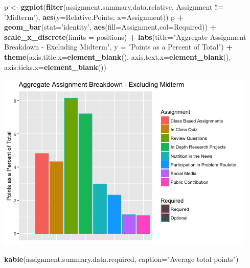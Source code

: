 \documentclass[]{article}
\newenvironment{Shaded}{\begin{snugshade}}{\end{snugshade}}
\newcommand{\KeywordTok}[1]{\textcolor[rgb]{0.13,0.29,0.53}{\textbf{#1}}}
\newcommand{\DataTypeTok}[1]{\textcolor[rgb]{0.13,0.29,0.53}{#1}}
\newcommand{\StringTok}[1]{\textcolor[rgb]{0.31,0.60,0.02}{#1}}
\newcommand{\OperatorTok}[1]{\textcolor[rgb]{0.81,0.36,0.00}{\textbf{#1}}}
\newcommand{\NormalTok}[1]{#1}
\begin{document}
\begin{Shaded}
\begin{Highlighting}[]
\NormalTok{p <-}\StringTok{ }\KeywordTok{ggplot}\NormalTok{(}\KeywordTok{filter}\NormalTok{(assignment.summary.data.relative, Assignment }\OperatorTok{!=}\StringTok{ 'Midterm'}\NormalTok{), }\KeywordTok{aes}\NormalTok{(}\DataTypeTok{y=}\NormalTok{Relative.Points, }\DataTypeTok{x=}\NormalTok{Assignment))}
\NormalTok{p }\OperatorTok{+}\StringTok{ }\KeywordTok{geom_bar}\NormalTok{(}\DataTypeTok{stat=}\StringTok{'identity'}\NormalTok{, }\KeywordTok{aes}\NormalTok{(}\DataTypeTok{fill=}\NormalTok{Assignment,}\DataTypeTok{col=}\NormalTok{Required)) }\OperatorTok{+}\StringTok{ }\KeywordTok{scale_x_discrete}\NormalTok{(}\DataTypeTok{limits =}\NormalTok{ positions) }\OperatorTok{+}\StringTok{   }
\StringTok{  }\KeywordTok{labs}\NormalTok{(}\DataTypeTok{title=}\StringTok{"Aggregate Assignment Breakdown - Excluding Midterm"}\NormalTok{, }\DataTypeTok{y =} \StringTok{"Points as a Percent of Total"}\NormalTok{) }\OperatorTok{+}
\StringTok{  }\KeywordTok{theme}\NormalTok{(}\DataTypeTok{axis.title.x=}\KeywordTok{element_blank}\NormalTok{(),}
        \DataTypeTok{axis.text.x=}\KeywordTok{element_blank}\NormalTok{(),}
        \DataTypeTok{axis.ticks.x=}\KeywordTok{element_blank}\NormalTok{())}
\end{Highlighting}
\end{Shaded}

\includegraphics{figures/points-from-assessments-summary-4.png}

\begin{Shaded}
\begin{Highlighting}[]
\KeywordTok{kable}\NormalTok{(assignment.summary.data.required, }\DataTypeTok{caption=}\StringTok{"Average total points"}\NormalTok{)}
\end{Highlighting}
\end{Shaded}
\end{document}
